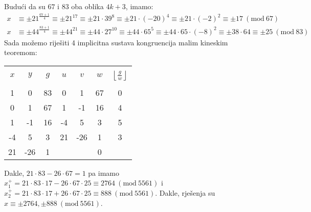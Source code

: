 \documentclass{exam}
\newcommand{\Mod}[1]{\ (\mathrm{mod}\ #1)}
\begin{document}
\begin{questions}
\begin{solution}
  Budući da su $67$ i $83$ oba oblika $4k + 3$, imamo:
  \begin{align*}
    x &\equiv \pm 21^{\frac{67 + 1}{4}} \equiv \pm 21^{17} \equiv \pm 21 \cdot 39^8 \equiv \pm 21 \cdot (-20)^4 \equiv \pm 21 \cdot (-2)^2 \equiv \pm 17 \Mod{67} \\
    x &\equiv \pm 44^{\frac{83 + 1}{4}} \equiv \pm 44^{21} \equiv \pm 44 \cdot 27^{10} \equiv \pm 44 \cdot 65^5 \equiv \pm 44 \cdot 65 \cdot (-8)^2 \equiv \pm 38 \cdot 64 \equiv \pm 25
    \Mod{83}
  \end{align*}
  Sada možemo riješiti 4 implicitna sustava kongruencija malim kineskim teoremom:
  \vspace*{0.25cm}
  \newline
  \begin{tabular}{|c|c|c|c|c|c|c|}
    \hline
    & & & & & &\\[-1em]
    $x$ & $y$ & $g$ & $u$ & $v$ & $w$ & $\left\lfloor \frac{g}{w} \right\rfloor$\\
    & & & & & &\\[-1em]
    \hline
    1 & 0 & 83 & 0 & 1 & 67 & 0\\
    0 & 1 & 67 & 1 & -1 & 16 & 4\\
    1 & -1 & 16 & -4 & 5 & 3 & 5\\
    -4 & 5 & 3 & 21 & -26 & 1 & 3\\
    21 & -26 & 1 & & & 0 & \\
    \hline
  \end{tabular}
  \vspace*{0.25cm}
  \newline
  Dakle, $21 \cdot 83 - 26 \cdot 67 = 1$ pa imamo $x_1^+ = 21 \cdot 83 \cdot 17 - 26 \cdot 67 \cdot 25 \equiv 2764 \Mod{5561}$ i $x_2^+ = 21 \cdot 83 \cdot 17 + 26 \cdot 67 \cdot 25 \equiv 888 \Mod{5561}$. Dakle, rješenja su $x \equiv \pm 2764, \pm 888 \Mod{5561}$.
\end{solution}

\end{questions}
\end{document}
